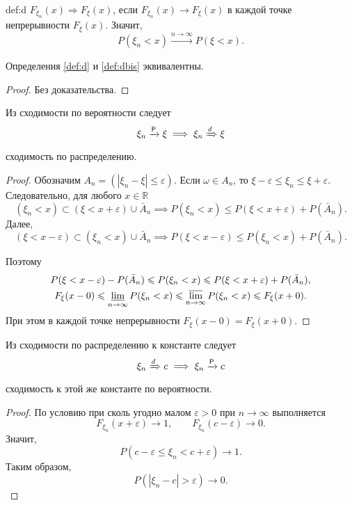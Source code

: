 \begin{dfnbis}{def:d}
	\label{def:dbis}
  $F_{\xi_n} (x) \Rightarrow F_\xi(x)$, если $F_{\xi_n}(x) \to F_\xi(x)$ в
	каждой точке непрерывности $F_\xi(x)$. Значит,
\[
	P(\xi_n < x) \xrightarrow[]{n\to\infty} P(\xi<x).
\]
\end{dfnbis}

\begin{theorem}
	Определения {\rm \ref{def:d}} и {\rm \ref{def:dbis}} эквивалентны.
\end{theorem}
\begin{proof} 
	Без доказательства. %
\end{proof}

\begin{utv}
	Из сходимости по вероятности следует 
	\[
			\xi_n \xrightarrow[]{\mathsf P} \xi \implies \xi_n \xRightarrow[]{d} \xi
	\]
	сходимость по распределению.
\end{utv}
\begin{proof}
	Обозначим $ A_n = (|\xi_n - \xi| \leqslant \varepsilon) $. Если $ \omega \in
	A_n $, то $ \xi -\varepsilon \leqslant \xi_n \leqslant \xi + \varepsilon $.
	Следовательно, для любого $ x \in \mathbb R $ 
	\[
		(\xi_n < x) \subset (\xi < x + \varepsilon) \cup \bar A_n \implies
		P(\xi_n < x) \leqslant P(\xi < x + \varepsilon) + P(\bar A_n).
	\]
	Далее, 
	\[
		(\xi < x - \varepsilon) \subset (\xi_n < x) \cup \bar A_n \implies P(\xi <
		x - \varepsilon) \leqslant P(\xi_n < x) + P(\bar A_n).
	\]

	Поэтому
	\begin{gather*}
	P(\xi < x -\varepsilon) - P(\bar A_n) \leqslant P(\xi_n < x) \leqslant P(\xi
	< x + \varepsilon) + P(\bar A_n),\\
	F_\xi(x-0) \leqslant \varliminf_{n\to\infty} P(\xi_n < x) \leqslant
	\varlimsup_{n\to\infty} P(\xi_n < x) \leqslant F_\xi (x + 0).
	\end{gather*}
При этом в каждой точке непрерывности $ F_\xi(x-0) = F_\xi(x+0) $.

\end{proof}

\begin{utv}
	Из сходимости по распределению к константе следует
	\[
			\xi_n \xRightarrow[]{d} c \implies \xi_n \xrightarrow[]{\mathsf P} c
	\]
сходимость к этой же константе по вероятности.	
\end{utv}
\begin{proof}
	По условию при сколь угодно малом $ \varepsilon > 0 $ при $ n \to \infty $ выполняется 
	\[
		F_{\xi_n}(x + \varepsilon) \to 1, \qquad F_{\xi_n}(c - \varepsilon) \to 0.
	\]
Значит, 
\[
		P(c - \varepsilon \leqslant \xi_n < c + \varepsilon) \to 1.
\]
Таким образом,  
\[
		P(|\xi_n - c| > \varepsilon) \to 0.
\]
	
\end{proof}



